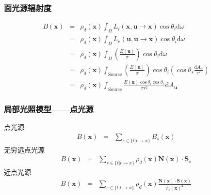 \documentclass{beamer}
\newcommand{\cdummy}{\cdot}
\newcommand{\mathd}{\mathrm{d}}
\newcommand{\tmfolded}[2]{\trivlist{\item[$\bullet$]\mbox{}#1}}
\newcommand{\tmmathbf}[1]{\ensuremath{\boldsymbol{#1}}}
\newcommand{\tmop}[1]{\ensuremath{\operatorname{#1}}}
\begin{document}
{{\begin{frame}
  \frametitle{面光源辐射度}
  \begin{eqnarray*}
    B (\tmmathbf{x}) & = & \rho_d (\tmmathbf{x}) \int_{\Omega} L_i
    (\tmmathbf{x}, \tmmathbf{u} \rightarrow \tmmathbf{x}) \cos \theta_i \mathd
    \omega\\
    & = & \rho_d (\tmmathbf{x}) \int_{\Omega} L_e (\tmmathbf{u}, \tmmathbf{u}
    \rightarrow \tmmathbf{x}) \cos \theta_i \mathd \omega\\
    & = & \rho_d (\tmmathbf{x}) \int_{\Omega} \left( \frac{E
    (\tmmathbf{u})}{\pi} \right) \cos \theta_i \mathd \omega\\
    & = & \rho_d (\tmmathbf{x}) \int_{\tmop{Source}} \left( \frac{E
    (\tmmathbf{u})}{\pi} \right) \cos \theta_i \left( \cos \theta_s
    \frac{\mathd A_{\tmmathbf{u}}}{r^2} \right)\\
    & = & \rho_d (\tmmathbf{x}) \int_{\tmop{Source}} \frac{E (\tmmathbf{u})
    \cos \theta_i \cos \theta_s}{\pi r^2} \mathd A_{\tmmathbf{u}}
  \end{eqnarray*}
  \tmfolded{$E (\tmmathbf{u}) = \pi L_e (\tmmathbf{u}, \tmmathbf{u}
  \rightarrow \tmmathbf{x})$}{\begin{eqnarray*}
    E & = & \int_0^{\frac{\pi}{2}} \int_0^{2 \pi} L \cdummy \cos \theta
    \cdummy \sin \theta \mathd \phi \mathd \theta\\
    & = & 2 \pi L \int_0^{\frac{\pi}{2}} \cos \theta \sin \theta \mathd
    \theta\\
    & = & \pi L \int_0^{\frac{\pi}{2}} \sin 2 \theta \mathd \theta\\
    & = & \pi L
  \end{eqnarray*}}
\end{frame}

\begin{frame}
  \frametitle{局部光照模型------点光源}
  
  点光源
  \begin{eqnarray*}
    B (\tmmathbf{x}) & = & \sum_{s \in \{ t|t \rightarrow x \}} B_s
    (\tmmathbf{x})
  \end{eqnarray*}
  无穷远点光源
  \begin{eqnarray*}
    B (\tmmathbf{x}) & = & \sum_{s \in \{ t|t \rightarrow x \}} \rho_d
    (\tmmathbf{x}) \tmmathbf{N} (\tmmathbf{x}) \cdummy \tmmathbf{S}_s
  \end{eqnarray*}
  近点光源
  \begin{eqnarray*}
    B (\tmmathbf{x}) & = & \sum_{s \in \{ t|t \rightarrow x \}} \rho_d
    (\tmmathbf{x}) \frac{\tmmathbf{N} (\tmmathbf{x}) \cdummy \tmmathbf{S}
    (\tmmathbf{x})}{r_s (\tmmathbf{x})^2}
  \end{eqnarray*}
\end{frame}

}}
\end{document}
